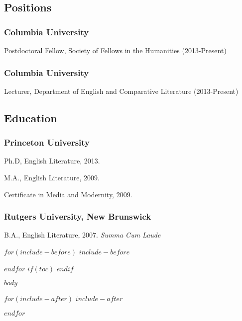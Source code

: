 \documentclass[11pt]{article}
\begin{document}
\bigskip\bigskip\medskip
{}
\reversemarginpar
\bigskip 

\subsection{Positions}

\subsubsection{Columbia University}
Postdoctoral Fellow, Society of Fellows in the Humanities (2013-Present)

\smallskip

\subsubsection{Columbia University}
Lecturer, Department of English and Comparative Literature (2013-Present)

\medskip

\subsection{Education}

\subsubsection{Princeton University}

Ph.D, English Literature, 2013.
 
\smallskip

M.A., English Literature, 2009.

\smallskip

Certificate in Media and Modernity, 2009. %

\medskip

\subsubsection{Rutgers University, New Brunswick}

B.A., English Literature, 2007. \emph{Summa Cum Laude} %

$for(include-before)$
$include-before$

$endfor$
$if(toc)$
\tableofcontents
$endif$

$body$

$for(include-after)$
$include-after$

$endfor$
\end{document}
